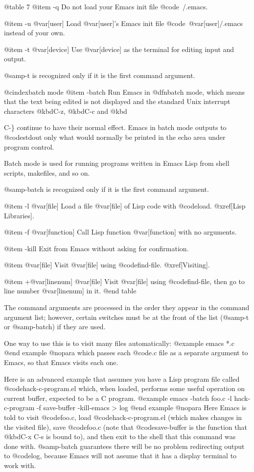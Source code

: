 {{@table 7
@item -q
Do not load your Emacs init file @code{~/.emacs}.

@item -u @var[user]
Load @var[user]'s Emacs init file @code{~@var[user]/.emacs} instead of
your own.

@item -t @var[device]
Use @var[device] as the terminal for editing input and output.

@samp{-t} is recognized only if it is the first command argument.

@cindex{batch mode}
@item -batch
Run Emacs in @dfn{batch mode}, which means that the text being
edited is not displayed and the standard Unix interrupt characters
@kbd{C-z}, @kbd{C-c} and @kbd{C-\} continue to have their normal
effect.  Emacs in batch mode outputs to @code{stdout} only what would
normally be printed in the echo area under program control.

Batch mode is used for running programs written in Emacs Lisp
from shell scripts, makefiles, and so on.

@samp{-batch} is recognized only if it is the first command argument.

@item -l @var[file]
Load a file @var[file] of Lisp code with @code{load}.  @xref[Lisp
Libraries].

@item -f @var[function]
Call Lisp function @var[function] with no arguments.

@item -kill
Exit from Emacs without asking for confirmation.

@item @var[file]
Visit @var[file] using @code{find-file}.  @xref[Visiting].

@item +@var[linenum] @var[file]
Visit @var[file] using @code{find-file}, then go to line number
@var[linenum] in it.
@end table

  The command arguments are processed in the order they appear in the
command argument list; however, certain switches must be at the front
of the list (@samp{-t} or @samp{-batch}) if they are used.

  One way to use this is to visit many files automatically:
@example
emacs *.c
@end example
@nopara
which passes each @code{.c} file as a separate argument to Emacs,
so that Emacs visits each one.
  
  Here is an advanced example that assumes you have a Lisp program
file called @code{hack-c-program.el} which, when loaded, performs some
useful operation on current buffer, expected to be a C program.
@example
emacs -batch foo.c -l hack-c-program -f save-buffer -kill-emacs > log
@end example
@nopara
Here Emacs is told to visit @code{foo.c}, load @code{hack-c-program.el}
(which makes changes in the visited file), save @code{foo.c}
(note that @code{save-buffer} is the function that @kbd{C-x C-s}
is bound to), and then exit to the shell that this command was
done with.  @samp{-batch} guarantees there will be no problem
redirecting output to @code{log}, because Emacs will not assume that
it has a display terminal to work with.

}}}
